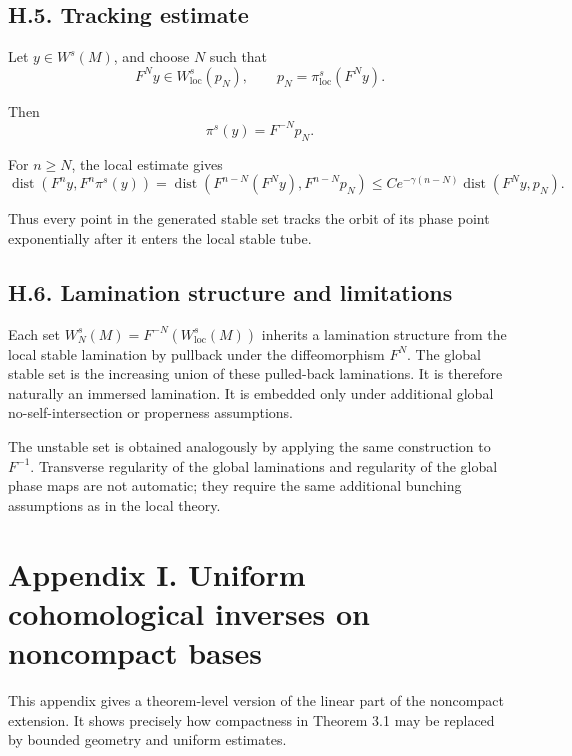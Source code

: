 \documentclass[12pt,a4paper]{article}
\theoremstyle{plain}
\numberwithin{equation}{section}
\numberwithin{theorem}{section}
\begin{document}
\subsection{H.5. Tracking estimate}

Let $y\in W^s(M)$, and choose $N$ such that
\[
F^N y
\in W^s_{\mathrm{loc}}(p_N),
\qquad
p_N=
\pi^s_{\mathrm{loc}}(F^N y).
\]

Then
\[
\pi^s(y)=F^{-N}p_N.
\]

For $n\ge N$, the local estimate gives
\[
\operatorname{dist}
\left(
F^n y,
F^n\pi^s(y)
\right)
=
\operatorname{dist}
\left(
F^{n-N}(F^N y),
F^{n-N}p_N
\right)
\le
C e^{-\gamma(n-N)}
\operatorname{dist}(F^N y,p_N).
\]

Thus every point in the generated stable set tracks the orbit of its phase point exponentially after it enters the local stable tube.

\subsection{H.6. Lamination structure and limitations}

Each set $W_N^s(M)=F^{-N}(W^s_{\mathrm{loc}}(M))$ inherits a lamination structure from the local stable lamination by pullback under the diffeomorphism $F^N$. The global stable set is the increasing union of these pulled-back laminations. It is therefore naturally an immersed lamination. It is embedded only under additional global no-self-intersection or properness assumptions.

The unstable set is obtained analogously by applying the same construction to $F^{-1}$. Transverse regularity of the global laminations and regularity of the global phase maps are not automatic; they require the same additional bunching assumptions as in the local theory.

\clearpage

\section{Appendix I. Uniform cohomological inverses on noncompact bases}

This appendix gives a theorem-level version of the linear part of the noncompact extension. It shows precisely how compactness in Theorem 3.1 may be replaced by bounded geometry and uniform estimates.
\end{document}
